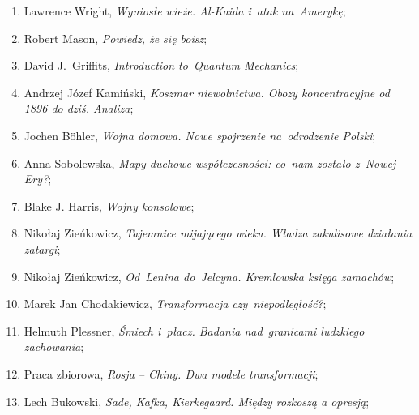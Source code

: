 \documentclass[a4paper,11pt]{article}
\begin{document}
\begin{enumerate}
\item Lawrence Wright, \textit{Wyniosłe wieże. Al-Kaida i~atak
    na~Amerykę};



\item Robert Mason, \textit{Powiedz, że się boisz};



\item David J.~Griffits, \textit{Introduction to~Quantum Mechanics};



\item Andrzej Józef Kamiński, \textit{Koszmar niewolnictwa. Obozy
    koncentracyjne od 1896 do dziś. Analiza};



\item Jochen B\"{o}hler, \textit{Wojna domowa. Nowe spojrzenie
    na~odrodzenie Polski};



\item Anna Sobolewska, \textit{Mapy duchowe współczesności: co~nam
    zostało z~Nowej Ery?};



\item Blake J. Harris, \textit{Wojny konsolowe};



\item Nikołaj Zieńkowicz, \textit{Tajemnice mijającego wieku. Władza
    zakulisowe działania zatargi};



\item Nikołaj Zieńkowicz, \textit{Od~Lenina do~Jelcyna. Kremlowska
    księga zamachów};



\item Marek Jan Chodakiewicz, \textit{Transformacja czy~niepodległość?};



\item Helmuth Plessner, \textit{Śmiech i~płacz. Badania nad~granicami
    ludzkiego zachowania};



\item Praca zbiorowa, \textit{Rosja -- Chiny. Dwa modele transformacji};



\item Lech Bukowski, \textit{Sade, Kafka, Kierkegaard. Między rozkoszą a
    opresją};




\end{enumerate}
\end{document}
